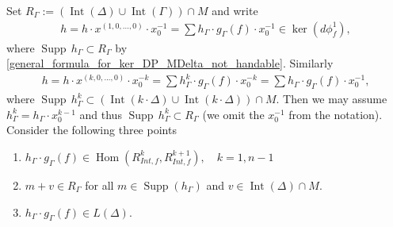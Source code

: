 \documentclass[12pt, english]{article}
\DeclareMathOperator{\Hom}{Hom}
\DeclareMathOperator{\Int}{Int}
\DeclareMathOperator{\Supp}{Supp}
\begin{document}

	Set $R_{\Gamma} := (\Int(\Delta) \cup \Int(\Gamma)) \cap M$ and write
	\begin{align*}
		h = h \cdot x^{(1,0,...,0)} \cdot x_0^{-1} = \sum h_{\Gamma} \cdot g_{\Gamma}(f) \cdot x_0^{-1} \in \ker(d \phi_f^1),
	\end{align*}
	where $\Supp \, h_{\Gamma} \subset R_{\Gamma}$ by \ref{general_formula_for_ker_DP_MDelta_not_handable}. Similarly
	\begin{align*}
		h = h \cdot x^{(k,0,...,0)} \cdot x_0^{-k} = \sum h_{\Gamma}^k \cdot g_{\Gamma}(f) \cdot x_0^{-k} = \sum h_{\Gamma} \cdot g_{\Gamma}(f) \cdot x_0^{-1},
	\end{align*}
	where $\Supp \, h_{\Gamma}^k \subset (\Int(k \cdot \Delta) \cup \Int(k \cdot \Delta)) \cap M$. Then we may assume $h_{\Gamma}^k = h_{\Gamma} \cdot x_0^{k-1}$ and thus $\Supp \, h_{\Gamma}^k \subset R_{\Gamma}$ (we omit the $x_0^{-1}$ from the notation). Consider the following three points
\begin{enumerate}
	\item $h_{\Gamma} \cdot g_{\Gamma}(f) \in \Hom(R_{Int,f}^k, R_{Int,f}^{k+1}), \quad k=1,n-1$
	\item $m+v \in R_{\Gamma}$ for all $m \in \Supp(h_{\Gamma})$ and $v \in \Int(\Delta) \cap M$.
	\item $h_{\Gamma} \cdot g_{\Gamma}(f) \in L(\Delta)$.
\end{enumerate}

	
\end{document}
